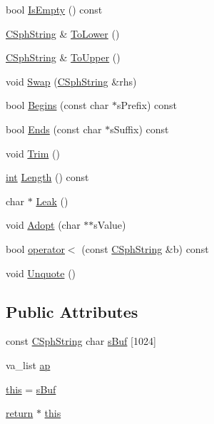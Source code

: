 \begin{DoxyCompactItemize}
\item 
bool \hyperlink{structCSphString_a3a3ca1fb348a18bee87df82a25bd048c}{Is\-Empty} () const 
\item 
\hyperlink{structCSphString}{C\-Sph\-String} \& \hyperlink{structCSphString_acfe1db93dbf833fd7776cf7f38b06f34}{To\-Lower} ()
\item 
\hyperlink{structCSphString}{C\-Sph\-String} \& \hyperlink{structCSphString_a898e6458dba59a1f89dc768eba362312}{To\-Upper} ()
\item 
void \hyperlink{structCSphString_a77c5263f96951717b4a22a62b5988903}{Swap} (\hyperlink{structCSphString}{C\-Sph\-String} \&rhs)
\item 
bool \hyperlink{structCSphString_a1bafc45f79598b0ebdbd28ac93a86b0c}{Begins} (const char $\ast$s\-Prefix) const 
\item 
bool \hyperlink{structCSphString_a4a54f0b11b5cfc9a245f6ad8bffee65c}{Ends} (const char $\ast$s\-Suffix) const 
\item 
void \hyperlink{structCSphString_a8a9f0b2fc54c56a7a209a6225be2a47a}{Trim} ()
\item 
\hyperlink{sphinxexpr_8cpp_a4a26e8f9cb8b736e0c4cbf4d16de985e}{int} \hyperlink{structCSphString_a99f55954e883197be6fc24701b80bad0}{Length} () const 
\item 
char $\ast$ \hyperlink{structCSphString_a6595f0cd1155e234edf126de2453901c}{Leak} ()
\item 
void \hyperlink{structCSphString_a18782719ca3c6d1d110cac968cfc001b}{Adopt} (char $\ast$$\ast$s\-Value)
\item 
bool \hyperlink{structCSphString_ae092f06f697449a9c6cbbd1c0d4890f6}{operator$<$} (const \hyperlink{structCSphString}{C\-Sph\-String} \&b) const 
\item 
void \hyperlink{structCSphString_a472c07e7a76fd854ed16db2105e09c6b}{Unquote} ()
\end{DoxyCompactItemize}
\subsection*{Public Attributes}
\begin{DoxyCompactItemize}
\item 
const \hyperlink{structCSphString}{C\-Sph\-String} char \hyperlink{structCSphString_a661025ca9389a788dad43bb9af8badd0}{s\-Buf} \mbox{[}1024\mbox{]}
\item 
va\-\_\-list \hyperlink{structCSphString_a4c58ce65bc91d1bbc191864b1f76b8e1}{ap}
\item 
\hyperlink{structCSphString_a149e21dab338f7bb7fa0b67c3cc2ebe2}{this} = \hyperlink{structCSphString_a661025ca9389a788dad43bb9af8badd0}{s\-Buf}
\item 
\hyperlink{sphinxsort_8cpp_a3a3a0de38f503963432a78b8a36aa74c}{return} $\ast$ \hyperlink{structCSphString_a6f470005cfc9ae68b042b8faae2cc197}{this}
\end{DoxyCompactItemize}
